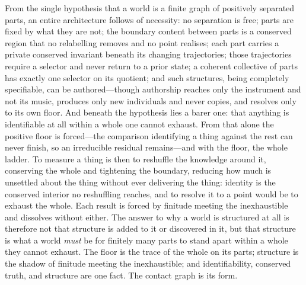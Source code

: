 \documentclass[11pt,a4paper]{article}
\theoremstyle{thmstyle}
\theoremstyle{definition}
\theoremstyle{remark}
\begin{document}
From the single hypothesis that a world is a finite graph of positively separated
parts, an entire architecture follows of necessity: no separation is free; parts
are fixed by what they are not; the boundary content between parts is a conserved
region that no relabelling removes and no point realises; each part carries a
private conserved invariant beneath its changing trajectories; those trajectories
require a selector and never return to a prior state; a coherent collective of
parts has exactly one selector on its quotient; and such structures, being
completely specifiable, can be authored---though authorship reaches only the
instrument and not its music, produces only new individuals and never copies, and
resolves only to its own floor. And beneath the hypothesis lies a barer one: that anything is identifiable at all
within a whole one cannot exhaust. From that alone the positive floor is
forced---the comparison identifying a thing against the rest can never finish, so
an irreducible residual remains---and with the floor, the whole ladder. To
measure a thing is then to reshuffle the knowledge around it, conserving the whole
and tightening the boundary, reducing how much is unsettled about the thing
without ever delivering the thing: identity is the conserved interior no
reshuffling reaches, and to resolve it to a point would be to exhaust the whole.
Each result is forced by finitude meeting the inexhaustible and dissolves without
either. The answer to why a world is structured at all is therefore not that
structure is added to it or discovered in it, but that structure is what a world
\emph{must} be for finitely many parts to stand apart within a whole they cannot
exhaust. The floor is the trace of the whole on its parts; structure is the shadow
of finitude meeting the inexhaustible; and identifiability, conserved truth, and
structure are one fact. The contact graph is its form.



\end{document}
